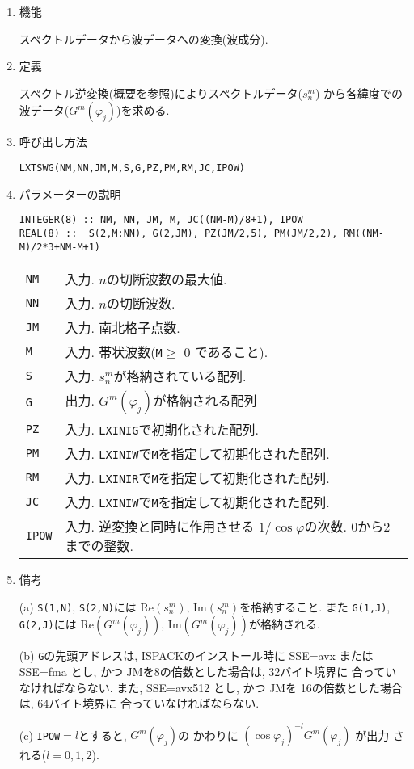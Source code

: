 \documentclass[a4j]{jarticle}
\begin{document}
\begin{enumerate}

\item 機能 

スペクトルデータから波データへの変換(波成分).

\item 定義

スペクトル逆変換(概要を参照)によりスペクトルデータ($s^m_n$)
から各緯度での波データ($G^m(\varphi_j)$)を求める.

\item 呼び出し方法 

\texttt{LXTSWG(NM,NN,JM,M,S,G,PZ,PM,RM,JC,IPOW)}
  
\item パラメーターの説明

\begin{verbatim}
INTEGER(8) :: NM, NN, JM, M, JC((NM-M)/8+1), IPOW
REAL(8) ::  S(2,M:NN), G(2,JM), PZ(JM/2,5), PM(JM/2,2), RM((NM-M)/2*3+NM-M+1)
\end{verbatim}
  
\begin{tabular}{ll}
\texttt{NM} & 入力. $n$の切断波数の最大値.\\
\texttt{NN} & 入力. $n$の切断波数.\\
\texttt{JM} & 入力. 南北格子点数.\\
\texttt{M} & 入力. 帯状波数(\texttt{M}$\ge$ 0 であること).\\
\texttt{S} & 入力. $s^m_n$が格納されている配列.\\
\texttt{G} & 出力. $G^m(\varphi_j)$が格納される配列\\
\texttt{PZ}  & 入力. \texttt{LXINIG}で初期化された配列.\\
\texttt{PM}  & 入力. \texttt{LXINIW}で\texttt{M}を指定して初期化された配列.\\
\texttt{RM} & 入力. \texttt{LXINIR}で\texttt{M}を指定して初期化された配列.\\
\texttt{JC} & 入力. \texttt{LXINIW}で\texttt{M}を指定して初期化された配列.\\
\texttt{IPOW} & 入力. 逆変換と同時に作用させる
                      $1/\cos\varphi$の次数. 0から2までの整数.
\end{tabular}

\item 備考

  (a) \texttt{S(1,N)}, \texttt{S(2,N)}には
  $\mbox{Re}(s^m_n)$, $\mbox{Im}(s^m_n)$を格納すること. また
\texttt{G(1,J)}, \texttt{G(2,J)}には  $\mbox{Re}(G^m(\varphi_j))$, 
$\mbox{Im}(G^m(\varphi_j))$が格納される.

(b) \texttt{G}の先頭アドレスは, 
ISPACKのインストール時に SSE=avx または SSE=fma とし, かつ
JMを8の倍数とした場合は, 32バイト境界に
合っていなければならない.
また, SSE=avx512 とし, かつ
JMを 16の倍数とした場合は, 64バイト境界に
合っていなければならない.

(c) \texttt{IPOW}$=l$とすると, $G^m(\varphi_j)$の
    かわりに $(\cos\varphi_j)^{-l}G^m(\varphi_j)$ が出力
    される($l=0,1,2$).

\end{enumerate}
\end{document}
